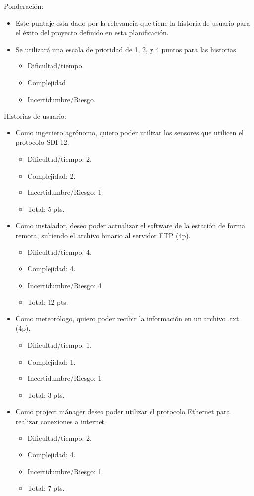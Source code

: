 \documentclass[
11pt, %
]{charter}
\begin{document}
Ponderación:
	\begin{itemize}
		\item Este puntaje esta dado por la relevancia que tiene la historia de usuario para el éxito del proyecto definido en esta planificación.
		\item Se utilizará una escala de prioridad de 1, 2, y 4 puntos para las historias.
		\begin{itemize}
			\item Dificultad/tiempo.
			\item Complejidad
			\item Incertidumbre/Riesgo.

		\end{itemize}
	\end{itemize}
Historias de usuario:
	\begin{itemize}
	\item Como ingeniero agrónomo, quiero poder utilizar los sensores que utilicen el protocolo SDI-12.
		\begin{itemize}
			\item Dificultad/tiempo: 2.
			\item Complejidad: 2.
			\item Incertidumbre/Riesgo: 1.
			\item Total: 5 pts.
		\end{itemize}
	\item Como instalador, deseo poder actualizar el software de la estación de forma remota, subiendo el archivo binario al servidor FTP (4p).
		\begin{itemize}
			\item Dificultad/tiempo: 4.
			\item Complejidad: 4.
			\item Incertidumbre/Riesgo: 4.
			\item Total: 12 pts.
		\end{itemize}
	\item Como meteorólogo, quiero poder recibir la información en un archivo .txt (4p).
		\begin{itemize}
			\item Dificultad/tiempo: 1.
			\item Complejidad: 1.
			\item Incertidumbre/Riesgo: 1.
			\item Total: 3 pts.
		\end{itemize}
	\item Como project mánager deseo poder utilizar el protocolo Ethernet para realizar conexiones a internet. 
		\begin{itemize}
			\item Dificultad/tiempo: 2.
			\item Complejidad: 4.
			\item Incertidumbre/Riesgo: 1.
			\item Total: 7 pts.
		\end{itemize}
	\end{itemize}
\end{document}
